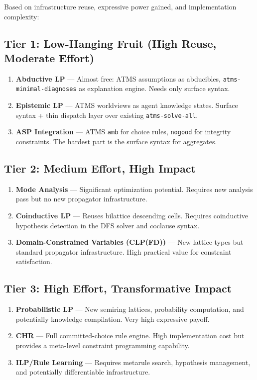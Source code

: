 \documentclass[11pt]{article}
\begin{document}
Based on infrastructure reuse, expressive power gained, and implementation complexity:
\subsection{Tier 1: Low-Hanging Fruit (High Reuse, Moderate Effort)}
\label{sec:org8fe1adf}

\begin{enumerate}
\item \textbf{Abductive LP} --- Almost free: ATMS assumptions as abducibles,
\texttt{atms-minimal-diagnoses} as explanation engine. Needs only surface syntax.

\item \textbf{Epistemic LP} --- ATMS worldviews as agent knowledge states. Surface syntax +
thin dispatch layer over existing \texttt{atms-solve-all}.

\item \textbf{ASP Integration} --- ATMS \texttt{amb} for choice rules, \texttt{nogood} for integrity
constraints. The hardest part is the surface syntax for aggregates.
\end{enumerate}
\subsection{Tier 2: Medium Effort, High Impact}
\label{sec:org7764653}

\begin{enumerate}
\item \textbf{Mode Analysis} --- Significant optimization potential. Requires new analysis
pass but no new propagator infrastructure.

\item \textbf{Coinductive LP} --- Reuses bilattice descending cells. Requires coinductive
hypothesis detection in the DFS solver and coclause syntax.

\item \textbf{Domain-Constrained Variables (CLP(FD))} --- New lattice types but standard
propagator infrastructure. High practical value for constraint satisfaction.
\end{enumerate}
\subsection{Tier 3: High Effort, Transformative Impact}
\label{sec:orgd5cff30}

\begin{enumerate}
\item \textbf{Probabilistic LP} --- New semiring lattices, probability computation, and
potentially knowledge compilation. Very high expressive payoff.

\item \textbf{CHR} --- Full committed-choice rule engine. High implementation cost but
provides a meta-level constraint programming capability.

\item \textbf{ILP/Rule Learning} --- Requires metarule search, hypothesis management,
and potentially differentiable infrastructure.
\end{enumerate}
\end{document}
